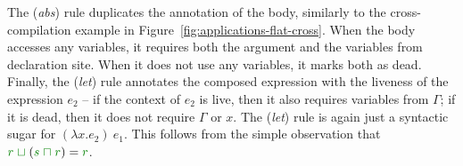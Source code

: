 The (\emph{abs}) rule duplicates the annotation of the body, similarly to the cross-compilation
example in Figure~\ref{fig:applications-flat-cross}. When the body accesses any variables, it
requires both the argument and the variables from declaration site. When it does not use any variables,
it marks both as dead. Finally, the (\emph{let}) rule annotates the composed expression with the
liveness of the expression $e_2$ -- if the context of $e_2$ is live, then it also requires variables
from $\Gamma$; if it is dead, then it does not require $\Gamma$ or $x$.
The (\emph{let}) rule is again just a syntactic sugar for
$(\lambda x.e_2)~e_1$. This follows from the simple observation that
$\cclrd{r} \;\cclrd{\sqcup}\; (\cclrd{s} \;\cclrd{\sqcap}\; \cclrd{r}) = \cclrd{r}$.



